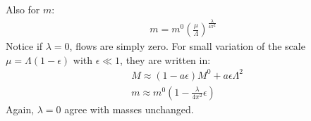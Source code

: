 \documentclass[fleqn]{article}
\begin{document}
Also for $m$:
\begin{align}
m = m^{0} (\frac{\mu}{\Lambda})^{\frac{\lambda}{4\pi ^{2} }}
\end{align}
Notice if $\lambda =0$, flows are simply zero. For small variation of the scale $\mu = \Lambda (1-\epsilon)$ with $\epsilon \ll 1$, they are written in:
\begin{align}
&M \approx (1-a\epsilon) M^{0} + a\epsilon\Lambda ^{2}  \\
& m \approx m^{0} (1-\frac{\lambda}{4\pi^{2}} \epsilon)
\end{align}
Again, $\lambda = 0$ agree with masses unchanged.  
\end{document}
